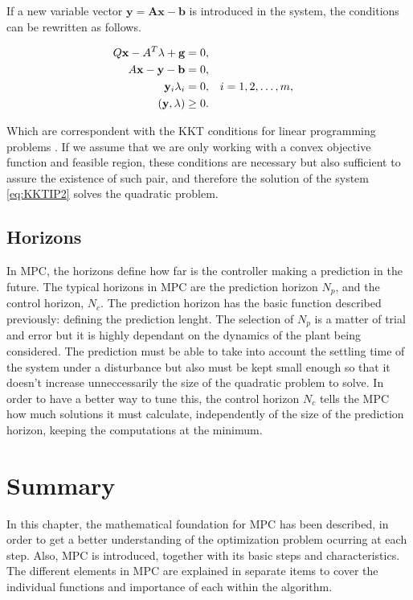 \begin{itemize}
If a new variable vector $\mathbf{y} = \mathbf{A}\mathbf{x} - \mathbf{b}$ is introduced in the system, the conditions can be rewritten as follows.

\begin{equation} \label{eq:KKTIP2}
 \begin{subequations}
 \begin{aligned}
  Q\mathbf{x} - A^{T}\lambda + \mathbf{g} &= 0, \\
  A\mathbf{x} - \mathbf{y} - \mathbf{b} &= 0, \\ 
  \mathbf{y}_{i}\lambda_{i} &= 0, && i = 1, 2, \ldots , m, \\
  (\mathbf{y}, \lambda) &\geq 0. 
 \end{aligned}
 \end{subequations}
\end{equation}

Which are correspondent with the KKT conditions for linear programming problems \cite{Nocedal}. If we assume that we are only working with a convex objective function and feasible region, these conditions are necessary but also sufficient to assure the existence of such pair, and therefore the solution of the system \ref{eq:KKTIP2} solves the quadratic problem.

\end{itemize}

\subsection{Horizons}

In MPC, the horizons define how far is the controller making a prediction in the future. The typical horizons in MPC are the prediction horizon $N_p$, and the control horizon, $N_c$. The prediction horizon has the basic function described previously: defining the prediction lenght. The selection of $N_p$ is a matter of trial and error but it is highly dependant on the dynamics of the plant being considered. The prediction must be able to take into account the settling time of the system under a disturbance but also must be kept small enough so that it doesn't increase unneccessarily the size of the quadratic problem to solve. In order to have a better way to tune this, the control horizon $N_c$ tells the MPC how much solutions it must calculate, independently of the size of the prediction horizon, keeping the computations at the minimum.

\section{Summary}

In this chapter, the mathematical foundation for MPC has been described, in order to get a better understanding of the optimization problem ocurring at each step. Also, MPC is introduced, together with its basic steps and characteristics. The different elements in MPC are explained in separate items to cover the individual functions and importance of each within the algorithm.
